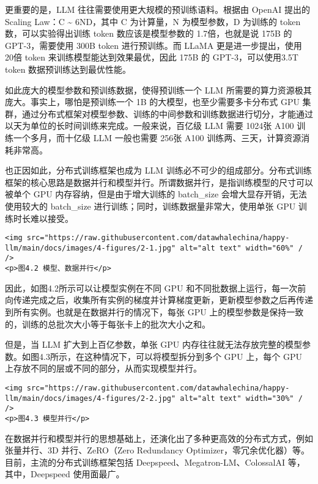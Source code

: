 \documentclass[
]{article}
\begin{document}
更重要的是，LLM 往往需要使用更大规模的预训练语料。根据由 OpenAI 提出的
Scaling Law：C \textasciitilde{} 6ND，其中 C 为计算量，N 为模型参数，D
为训练的 token 数，可以实验得出训练 token 数应该是模型参数的
1.7倍，也就是说 175B 的 GPT-3，需要使用 300B token 进行预训练。而 LLaMA
更是进一步提出，使用 20倍 token 来训练模型能达到效果最优，因此 175B 的
GPT-3，可以使用3.5T token 数据预训练达到最优性能。

如此庞大的模型参数和预训练数据，使得预训练一个 LLM
所需要的算力资源极其庞大。事实上，哪怕是预训练一个 1B
的大模型，也至少需要多卡分布式 GPU
集群，通过分布式框架对模型参数、训练的中间参数和训练数据进行切分，才能通过以天为单位的长时间训练来完成。一般来说，百亿级
LLM 需要 1024张 A100 训练一个多月，而十亿级 LLM 一般也需要 256张 A100
训练两、三天，计算资源消耗非常高。

也正因如此，分布式训练框架也成为 LLM
训练必不可少的组成部分。分布式训练框架的核心思路是数据并行和模型并行。所谓数据并行，是指训练模型的尺寸可以被单个
GPU 内存容纳，但是由于增大训练的 batch\_size
会增大显存开销，无法使用较大的 batch\_size
进行训练；同时，训练数据量非常大，使用单张 GPU 训练时长难以接受。

\begin{verbatim}
<img src="https://raw.githubusercontent.com/datawhalechina/happy-llm/main/docs/images/4-figures/2-1.jpg" alt="alt text" width="60%" / />
<p>图4.2 模型、数据并行</p>
\end{verbatim}

因此，如图4.2所示可以让模型实例在不同 GPU
和不同批数据上运行，每一次前向传递完成之后，收集所有实例的梯度并计算梯度更新，更新模型参数之后再传递到所有实例。也就是在数据并行的情况下，每张
GPU
上的模型参数是保持一致的，训练的总批次大小等于每张卡上的批次大小之和。

但是，当 LLM 扩大到上百亿参数，单张 GPU
内存往往就无法存放完整的模型参数。如图4.3所示，在这种情况下，可以将模型拆分到多个
GPU 上，每个 GPU 上存放不同的层或不同的部分，从而实现模型并行。

\begin{verbatim}
<img src="https://raw.githubusercontent.com/datawhalechina/happy-llm/main/docs/images/4-figures/2-2.jpg" alt="alt text" width="30%" / />
<p>图4.3 模型并行</p>
\end{verbatim}

在数据并行和模型并行的思想基础上，还演化出了多种更高效的分布式方式，例如张量并行、3D
并行、ZeRO（Zero Redundancy
Optimizer，零冗余优化器）等。目前，主流的分布式训练框架包括
Deepspeed、Megatron-LM、ColossalAI 等，其中，Deepspeed 使用面最广。
\end{document}
